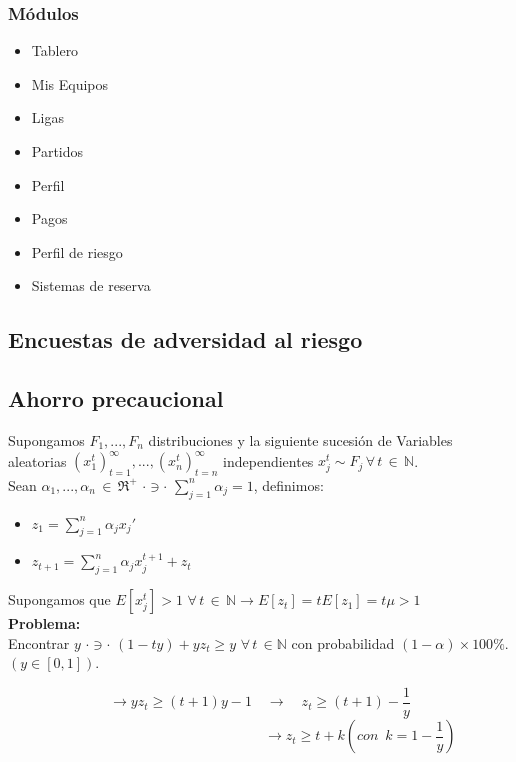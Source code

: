 \subsubsection{Módulos}

 \begin{itemize}
 	\item Tablero
 	\item Mis Equipos
 	\item Ligas
 	\item Partidos
 	\item Perfil
 	\item Pagos
 	\item Perfil de riesgo
 	\item Sistemas de reserva
 \end{itemize}
 
\subsection{Encuestas de adversidad al riesgo}
\subsection{Ahorro precaucional}

Supongamos $F_1,...,F_n$ distribuciones y la siguiente sucesión de Variables aleatorias $(x_1^t)_{t=1}^{\infty},..., (x_n^t)_{t=n}^{\infty}$ independientes $x_j^{t} \sim F_j \,\forall\, t\, \in\, \mathbb{N}$.\\

Sean $\alpha_1,..., \alpha_n\,\in\,\Re^+\,\, \cdot \ni \cdot \,\,\displaystyle \sum_{j=1}^n\alpha_j=1$, definimos:

\begin{itemize}
 \item $z_1=\displaystyle \sum_{j=1}^n\alpha_jx_j'$ 
 \item $z_{t+1}=\displaystyle \sum_{j=1}^n\alpha_jx_j^{t+1}+z_t$ 
\end{itemize}
Supongamos que $E[x_j^t]>1\,\,\forall\,t \,\in\,\mathbb{N}\rightarrow E[z_t]=tE[z_1]=t\mu>1$\\

{\bf Problema:}\\
Encontrar $y \,\,\cdot \ni\cdot\,\,(1-ty)+yz_t \ge y\,\,\forall\,t\,\in \mathbb{N}$ con probabilidad $(1-\alpha)\times 100\%$. $(y\in[0,1])$.

$$\rightarrow y z_t\ge (t+1)y-1\quad\rightarrow\quad z_t\ge(t+1)-\frac{1}{y}$$
$$\qquad\qquad\qquad\qquad\qquad\qquad\qquad\,\,\rightarrow z_t\ge t+k (con\,\,\,k=1-\frac{1}{y})$$

